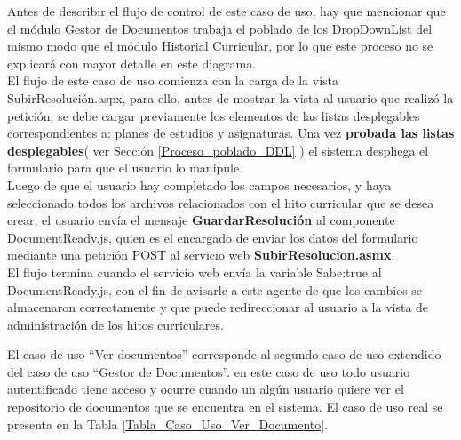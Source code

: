 	
	Antes de describir el flujo de control de este caso de uso, hay que mencionar que el módulo Gestor de Documentos trabaja el poblado de los DropDownList del mismo modo que el módulo Historial Curricular, por lo que este proceso no se explicará  con mayor detalle en este diagrama.\\
	
	El flujo de este caso de uso comienza con la carga de la vista SubirResolución.aspx, para ello, antes de mostrar la vista al usuario que realizó la petición, se debe cargar previamente los elementos de las listas  desplegables correspondientes a: planes de estudios y asignaturas. Una vez   \textbf{probada las   listas  desplegables}( ver Sección \ref{Proceso_poblado_DDL} ) el sistema despliega el formulario para que el usuario lo manipule.\\
	
	Luego de que el usuario hay completado los campos necesarios, y haya seleccionado todos los archivos relacionados con el hito curricular que se desea crear, el usuario envía el mensaje \textbf{GuardarResolución} al componente DocumentReady.js, quien es el encargado de  enviar los datos del formulario mediante una petición POST al servicio web \textbf{SubirResolucion.asmx}.\\
	
	El flujo termina cuando el servicio web envía la variable Sabe:true al DocumentReady.js, con el fin de avisarle a este agente de que los cambios se almacenaron correctamente y que puede redireccionar al usuario a la vista de administración de los hitos curriculares.

	
	

	
	
	
	El caso de uso ``Ver documentos'' corresponde al segundo caso de uso extendido del caso de uso  ``Gestor de Documentos''. en este caso de uso  todo usuario autentificado tiene acceso y ocurre cuando un  algún usuario quiere ver el repositorio de documentos que se encuentra en el sistema. El caso de uso real se presenta en la Tabla  \ref{Tabla_Caso_Uso_Ver_Documento}.
	
